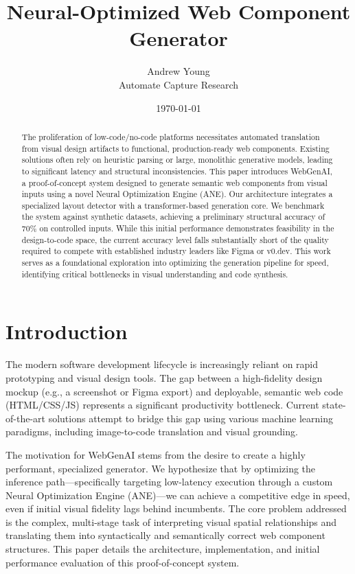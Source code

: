 \documentclass[11pt,a4paper]{article}
\title{Neural-Optimized Web Component Generator}
\author{Andrew Young \\ Automate Capture Research}
\date{\today}
\begin{document}
\maketitle

\begin{abstract}
The proliferation of low-code/no-code platforms necessitates automated translation from visual design artifacts to functional, production-ready web components. Existing solutions often rely on heuristic parsing or large, monolithic generative models, leading to significant latency and structural inconsistencies. This paper introduces WebGenAI, a proof-of-concept system designed to generate semantic web components from visual inputs using a novel Neural Optimization Engine (ANE). Our architecture integrates a specialized layout detector with a transformer-based generation core. We benchmark the system against synthetic datasets, achieving a preliminary structural accuracy of 70\% on controlled inputs. While this initial performance demonstrates feasibility in the design-to-code space, the current accuracy level falls substantially short of the quality required to compete with established industry leaders like Figma or v0.dev. This work serves as a foundational exploration into optimizing the generation pipeline for speed, identifying critical bottlenecks in visual understanding and code synthesis.
\end{abstract}

\section{Introduction}
The modern software development lifecycle is increasingly reliant on rapid prototyping and visual design tools. The gap between a high-fidelity design mockup (e.g., a screenshot or Figma export) and deployable, semantic web code (HTML/CSS/JS) represents a significant productivity bottleneck. Current state-of-the-art solutions attempt to bridge this gap using various machine learning paradigms, including image-to-code translation and visual grounding.

The motivation for WebGenAI stems from the desire to create a highly performant, specialized generator. We hypothesize that by optimizing the inference path—specifically targeting low-latency execution through a custom Neural Optimization Engine (ANE)—we can achieve a competitive edge in speed, even if initial visual fidelity lags behind incumbents. The core problem addressed is the complex, multi-stage task of interpreting visual spatial relationships and translating them into syntactically and semantically correct web component structures. This paper details the architecture, implementation, and initial performance evaluation of this proof-of-concept system.
\end{document}
